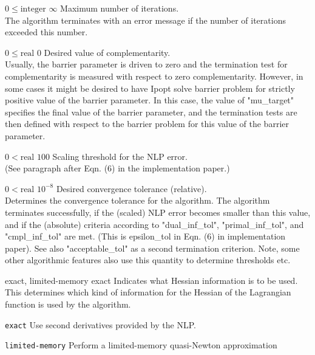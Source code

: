 %
{$0\leq\textrm{integer}$}%
{$\infty$}%
{Maximum number of iterations.\\
The algorithm terminates with an error message if the number of iterations exceeded this number.}%
{}

%
{$0\leq\textrm{real}$}%
{$0$}%
{Desired value of complementarity.\\
Usually, the barrier parameter is driven to zero and the termination test for complementarity is measured with respect to zero complementarity.  However, in some cases it might be desired to have Ipopt solve barrier problem for strictly positive value of the barrier parameter.  In this case, the value of "mu\_target" specifies the final value of the barrier parameter, and the termination tests are then defined with respect to the barrier problem for this value of the barrier parameter.}%
{}

%
{$0<\textrm{real}$}%
{$100$}%
{Scaling threshold for the NLP error.\\
(See paragraph after Eqn. (6) in the implementation paper.)}%
{}

%
{$0<\textrm{real}$}%
{$10^{- 8}$}%
{Desired convergence tolerance (relative).\\
Determines the convergence tolerance for the algorithm.  The algorithm terminates successfully, if the (scaled) NLP error becomes smaller than this value, and if the (absolute) criteria according to "dual\_inf\_tol", "primal\_inf\_tol", and "cmpl\_inf\_tol" are met.  (This is epsilon\_tol in Eqn. (6) in implementation paper).  See also "acceptable\_tol" as a second termination criterion.  Note, some other algorithmic features also use this quantity to determine thresholds etc.}%
{}

%
{\ttfamily exact, limited-memory}%
{exact}%
{Indicates what Hessian information is to be used.\\
This determines which kind of information for the Hessian of the Lagrangian function is used by the algorithm.}%
{\begin{list}{}{
\setlength{\parsep}{0em}
\setlength{\leftmargin}{5ex}
\setlength{\labelwidth}{2ex}
\setlength{\itemindent}{0ex}
\setlength{\topsep}{0pt}}
\item[\texttt{exact}] Use second derivatives provided by the NLP.
\item[\texttt{limited-memory}] Perform a limited-memory quasi-Newton approximation
\end{list}
}

